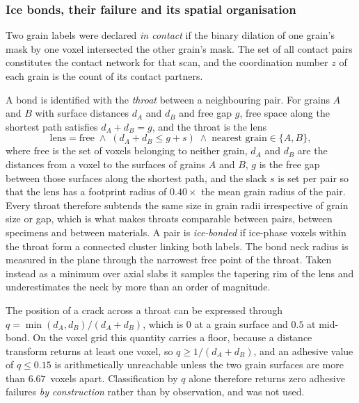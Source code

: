 \documentclass[preprint,12pt,numbers]{elsarticle}
\begin{document}
  \subsubsection{Ice bonds, their failure and its spatial organisation}
  \label{sec:bonds}
  \label{sec:failuremode}
  \label{sec:planar}
  Two grain labels were declared \emph{in contact} if the binary dilation of
  one grain's mask by one voxel intersected the other grain's mask.  The set
  of all contact pairs constitutes the contact network for that scan, and the
  coordination number $z$ of each grain is the count of its contact partners.

  A bond is identified with the \emph{throat} between a neighbouring pair.  For
  grains $A$ and $B$ with surface distances $d_A$ and $d_B$ and free gap $g$,
  free space along the shortest path satisfies $d_A + d_B = g$, and the throat
  is the lens
  \begin{equation}
    \mathrm{lens} = \mathrm{free} \;\wedge\; (d_A + d_B \leq g + s)
                    \;\wedge\; \text{nearest grain} \in \{A,B\},
    \label{eq:throat}
  \end{equation}
  where $\mathrm{free}$ is the set of voxels belonging to neither grain, $d_A$
  and $d_B$ are the distances from a voxel to the surfaces of grains $A$ and
  $B$, $g$ is the free gap between those surfaces along the shortest path, and
  the slack $s$ is set per pair so that the lens has a footprint radius of
  $0.40\times$ the mean grain radius of the pair.  Every throat therefore
  subtends the same size in grain radii irrespective of grain size or gap, which
  is what makes throats comparable between pairs, between specimens and between
  materials.  A pair is \emph{ice-bonded} if ice-phase voxels within the throat
  form a connected cluster linking both labels.  The bond neck radius is
  measured in the plane through the narrowest free point of the throat.  Taken
  instead as a minimum over axial slabs it samples the tapering rim of the lens
  and underestimates the neck by more than an order of magnitude.

  The position of a crack across a throat can be expressed through
  $q = \min(d_A,d_B)/(d_A+d_B)$, which is $0$ at a grain surface and $0.5$ at
  mid-bond.  On the voxel grid this quantity carries a floor, because a distance
  transform returns at least one voxel, so $q \geq 1/(d_A+d_B)$, and an
  adhesive value of $q \leq 0.15$ is arithmetically unreachable unless the two
  grain surfaces are more than $6.67$~voxels apart.  Classification by $q$ alone
  therefore returns zero adhesive failures \emph{by construction} rather than by
  observation, and was not used.
\end{document}
